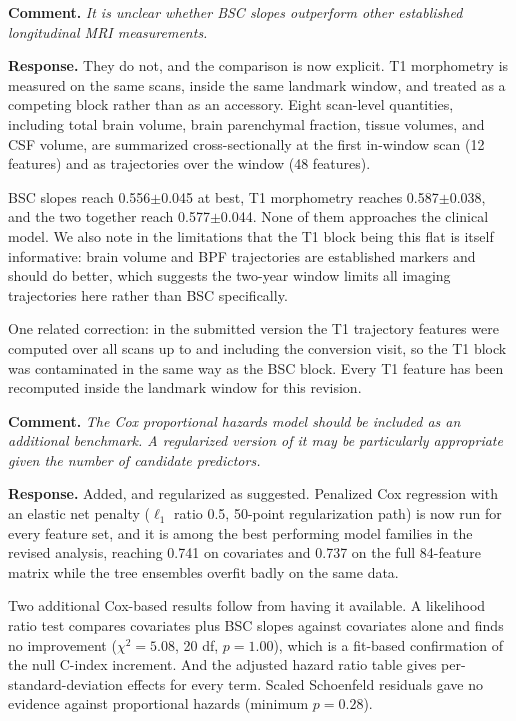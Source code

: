 \documentclass[11pt]{article}
\newcommand{\comment}[1]{\vspace{6pt}\noindent\textbf{Comment.} \textit{#1}\par\vspace{2pt}}
\newcommand{\response}{\noindent\textbf{Response.} }
\begin{document}
\comment{It is unclear whether BSC slopes outperform other established longitudinal MRI measurements.}

\response They do not, and the comparison is now explicit. T1 morphometry is measured on the same scans, inside the same landmark window, and treated as a competing block rather than as an accessory. Eight scan-level quantities, including total brain volume, brain parenchymal fraction, tissue volumes, and CSF volume, are summarized cross-sectionally at the first in-window scan (12 features) and as trajectories over the window (48 features).

BSC slopes reach 0.556$\pm$0.045 at best, T1 morphometry reaches 0.587$\pm$0.038, and the two together reach 0.577$\pm$0.044. None of them approaches the clinical model. We also note in the limitations that the T1 block being this flat is itself informative: brain volume and BPF trajectories are established markers and should do better, which suggests the two-year window limits all imaging trajectories here rather than BSC specifically.

One related correction: in the submitted version the T1 trajectory features were computed over all scans up to and including the conversion visit, so the T1 block was contaminated in the same way as the BSC block. Every T1 feature has been recomputed inside the landmark window for this revision.

\comment{The Cox proportional hazards model should be included as an additional benchmark. A regularized version of it may be particularly appropriate given the number of candidate predictors.}

\response Added, and regularized as suggested. Penalized Cox regression with an elastic net penalty ($\ell_1$ ratio 0.5, 50-point regularization path) is now run for every feature set, and it is among the best performing model families in the revised analysis, reaching 0.741 on covariates and 0.737 on the full 84-feature matrix while the tree ensembles overfit badly on the same data.

Two additional Cox-based results follow from having it available. A likelihood ratio test compares covariates plus BSC slopes against covariates alone and finds no improvement ($\chi^2 = 5.08$, 20 df, $p = 1.00$), which is a fit-based confirmation of the null C-index increment. And the adjusted hazard ratio table gives per-standard-deviation effects for every term. Scaled Schoenfeld residuals gave no evidence against proportional hazards (minimum $p = 0.28$).
\end{document}
